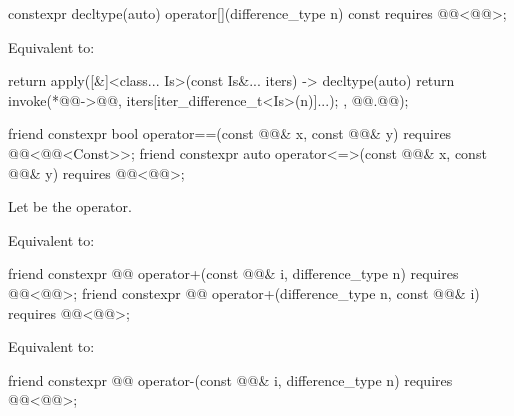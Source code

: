%
\begin{itemdecl}
constexpr decltype(auto) operator[](difference_type n) const
  requires @@<@@>;
\end{itemdecl}

\begin{itemdescr}
\pnum
\effects
Equivalent to:
\begin{codeblock}
return apply([&]<class... Is>(const Is&... iters) -> decltype(auto) {
  return invoke(*@@->@@, iters[iter_difference_t<Is>(n)]...);
}, @@.@@);
\end{codeblock}
\end{itemdescr}

%
\begin{itemdecl}
friend constexpr bool operator==(const @@& x, const @@& y)
  requires @@<@@<Const>>;
friend constexpr auto operator<=>(const @@& x, const @@& y)
  requires @@<@@>;
\end{itemdecl}

\begin{itemdescr}
\pnum
Let  be the operator.

\pnum
\effects
Equivalent to:
\end{itemdescr}

%
\begin{itemdecl}
friend constexpr @@ operator+(const @@& i, difference_type n)
  requires @@<@@>;
friend constexpr @@ operator+(difference_type n, const @@& i)
  requires @@<@@>;
\end{itemdecl}

\begin{itemdescr}
\pnum
\effects
Equivalent to:
\end{itemdescr}

%
\begin{itemdecl}
friend constexpr @@ operator-(const @@& i, difference_type n)
  requires @@<@@>;
\end{itemdecl}

